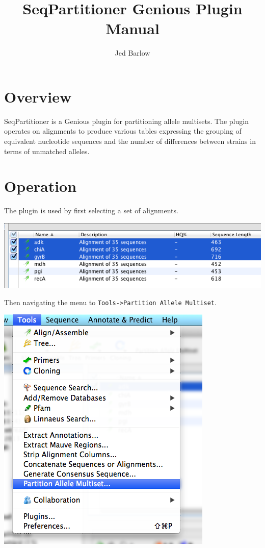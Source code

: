 \documentclass[12pt,letterpaper]{article}
\author{Jed Barlow}
\title{SeqPartitioner Genious Plugin Manual}
\begin{document}
\maketitle

\hfill

\tableofcontents

\newpage
\section{Overview}

SeqPartitioner is a Genious plugin for partitioning allele multisets.  The
plugin operates on alignments to produce various tables expressing the
grouping of equivalent nucleotide sequences and the number of differences
between strains in terms of unmatched alleles.

\section{Operation}
The plugin is used by first selecting a set of alignments.

\hfill

\includegraphics[resolution=120]{alignment_selection.png}

\hfill

Then navigating the menu to \texttt{Tools->Partition Allele Multiset}.


\hfill

\includegraphics[resolution=130]{menu_entry.png}
\end{document}
